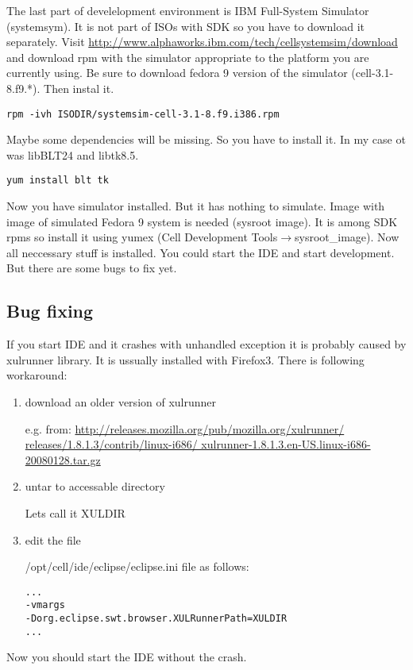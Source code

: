The last part of develelopment environment is IBM Full-System Simulator (systemsym). It is not part of ISOs with SDK so you have to download it separately. Visit \url{http://www.alphaworks.ibm.com/tech/cellsystemsim/download} and download rpm with the simulator appropriate to the platform you are currently using. Be sure to download fedora 9 version of the simulator (cell-3.1-8.f9.*). Then instal it.

\begin{verbatim}
rpm -ivh ISODIR/systemsim-cell-3.1-8.f9.i386.rpm
\end{verbatim}

Maybe some dependencies will be missing. So you have to install it. In my case ot was libBLT24 and libtk8.5.

\begin{verbatim}
yum install blt tk
\end{verbatim}

Now you have simulator installed. But it has nothing to simulate. Image with image of simulated Fedora 9 system is needed (sysroot image). It is among SDK rpms so install it using yumex (Cell Development Tools$\rightarrow$sysroot\_image).
Now all neccessary stuff is installed. You could start the IDE and start development. But there are some bugs to fix yet. 

\subsection{Bug fixing}

If you start IDE and it crashes with unhandled exception it is probably caused by xulrunner library. It is ussually installed with Firefox3. There is following workaround:
\begin{enumerate}
\item download an older version of xulrunner

e.g. from: \url{http://releases.mozilla.org/pub/mozilla.org/xulrunner/ releases/1.8.1.3/contrib/linux-i686/ xulrunner-1.8.1.3.en-US.linux-i686-20080128.tar.gz}

\item untar to accessable directory

Lets call it XULDIR

\item edit the file

/opt/cell/ide/eclipse/eclipse.ini file as follows:
\begin{verbatim}
...
-vmargs
-Dorg.eclipse.swt.browser.XULRunnerPath=XULDIR
...
\end{verbatim}
\end{enumerate}
Now you should start the IDE without the crash.


